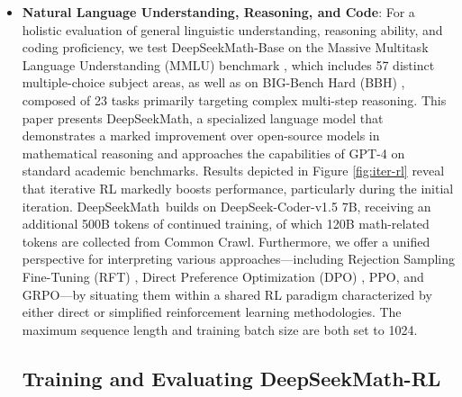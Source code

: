 \begin{itemize}[topsep=0pt]
\begin{itemize}
Here, the symbols $\varepsilon$ and $\beta$ remain as tunable hyper-parameters, while $\hat{A}_{i,t}$ is an advantage term evaluated using only the intra-group relative reward structure, as will be elaborated in subsequent subsections. Moreover, as the DeepSeekMath Corpus supports multiple languages, our experiments reveal gains on Chinese mathematical benchmarks \citep{wei2023cmath,agieval}. This substantial enhancement in mathematical reasoning is rooted in two main elements: firstly, the exploitation of vast quantities of openly available web material, systematically curated through an advanced data filtering pipeline; secondly, the development of Group Relative Policy Optimization (GRPO), an extension of Proximal Policy Optimization (PPO), which both elevates mathematical reasoning capabilities and streamlines PPO memory utilization. We posit that our methodology for assembling mathematical datasets sets a promising foundation for continued work in this area, acknowledging the considerable potential for future advancements. As illustrated in Figure \ref{fig:rl-analysis}, GRPO outperforms online RFT, thereby emphasizing the effectiveness of modifying positive and negative gradient coefficients. \item \textbf{Natural Language Understanding, Reasoning, and Code}: For a holistic evaluation of general linguistic understanding, reasoning ability, and coding proficiency, we test DeepSeekMath-Base on the Massive Multitask Language Understanding (MMLU) benchmark \citep{mmlu}, which includes 57 distinct multiple-choice subject areas, as well as on BIG-Bench Hard (BBH) \citep{bbh}, composed of 23 tasks primarily targeting complex multi-step reasoning. This paper presents DeepSeekMath, a specialized language model that demonstrates a marked improvement over open-source models in mathematical reasoning and approaches the capabilities of GPT-4 on standard academic benchmarks. Results depicted in Figure \ref{fig:iter-rl} reveal that iterative RL markedly boosts performance, particularly during the initial iteration. DeepSeekMath~builds on DeepSeek-Coder-v1.5 7B, receiving an additional 500B tokens of continued training, of which 120B math-related tokens are collected from Common Crawl. Furthermore, we offer a unified perspective for interpreting various approaches—including Rejection Sampling Fine-Tuning (RFT) \citep{yuan2023scaling}, Direct Preference Optimization (DPO) \citep{dpo}, PPO, and GRPO—by situating them within a shared RL paradigm characterized by either direct or simplified reinforcement learning methodologies. The maximum sequence length and training batch size are both set to 1024. \subsection{Training and Evaluating DeepSeekMath-RL}


\end{itemize}
\end{itemize}
